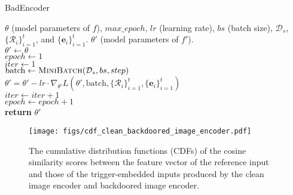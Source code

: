 \appendices


\begin{algorithm}[tb]
   \caption{BadEncoder}
   \label{alg:example}
\begin{algorithmic}
    $\theta$ (model parameters of $f$), $max\_epoch$, $lr$ (learning rate), $bs$ (batch size), $\mathcal{D}_{s}$, $\{\mathcal{R}_i\}_{i=1}^t$, and $\{\mathbf{e}_i\}_{i=1}^t$.
     $\theta'$ (model parameters of $f'$). \\
   $\theta' \gets \theta$ \\
   $epoch \gets 1$ \\
   \STATE $iter \gets 1$ \\
   \STATE  $\text{batch} \gets \textsc{MiniBatch}(\mathcal{D}_s, bs, step)$ \\
   \STATE $\theta' = \theta' - lr \cdot \nabla_{\theta'} L(\theta',\text{batch},\{\mathcal{R}_i\}_{i=1}^t, \{\mathbf{e}_i\}_{i=1}^t)$\\
   \STATE $iter \gets iter +1$ \\
   \ENDWHILE
   \STATE $epoch \gets epoch+1$ \\
   \ENDWHILE 
   \STATE \textbf{return} $\theta'$

   
\end{algorithmic}
\end{algorithm}



\begin{figure}[!t]
	 \centering
	\vspace{-2mm}
{\texttt{[image: figs/cdf\_clean\_backdoored\_image\_encoder.pdf]}}
\vspace{-2mm}
\caption{The cumulative distribution functions (CDFs) of the cosine similarity scores between the feature vector of the reference input and those of the trigger-embedded inputs produced  by  the  clean image encoder and backdoored image encoder.} 
\label{compare_similarity_of_clean_backdoor}
\end{figure}



